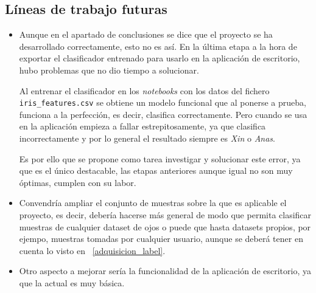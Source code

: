\subsection{Líneas de trabajo futuras}
\begin{itemize}
    \item Aunque en el apartado de conclusiones se dice que el proyecto se ha desarrollado correctamente, esto no es así.
    En la última etapa a la hora de exportar el clasificador entrenado para usarlo en la aplicación de escritorio, hubo problemas que no dio tiempo a solucionar.
    
    Al entrenar el clasificador en los \emph{notebooks} con los datos del fichero \texttt{iris\_features.csv} se obtiene un modelo funcional que al ponerse a prueba, funciona a la perfección, es decir, clasifica correctamente. Pero cuando se usa en la aplicación empieza a fallar estrepitosamente, ya que clasifica incorrectamente y por lo general el resultado siempre es \emph{Xin} o \emph{Anas}.
    
    Es por ello que se propone como tarea investigar y solucionar este error, ya que es el único destacable, las etapas anteriores aunque igual no son muy óptimas, cumplen con su labor.
    \item Convendría ampliar el conjunto de muestras sobre la que es aplicable el proyecto, es decir, debería hacerse más general de modo que permita clasificar muestras de cualquier dataset de ojos o puede que hasta datasets propios, por ejempo, muestras tomadas por cualquier usuario, aunque se deberá tener en cuenta lo visto en ~\ref{adquisicion_label}.
    \item Otro aspecto a mejorar sería la funcionalidad de la aplicación de escritorio, ya que la actual es muy básica.
\end{itemize}
